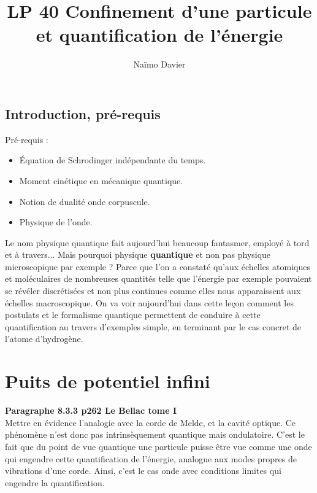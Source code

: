 \documentclass[12pt,prb,aps,epsf]{article}
\begin{document}
	
	\title{LP 40 Confinement d'une particule et quantification de l'énergie}
	\author{Naïmo Davier}
	
	\maketitle
	
	\tableofcontents
	
	\pagebreak
	
\subsection{Introduction, pré-requis}
Pré-requis : 
\begin{itemize}
	\item Équation de Schrodinger indépendante du temps.
	\item Moment cinétique en mécanique quantique.
	\item Notion de dualité onde corpuscule.
	\item Physique de l'onde.
\end{itemize}

Le nom physique quantique fait aujourd'hui beaucoup fantasmer, employé à tord et à travers... Mais pourquoi physique \textbf{quantique} et non pas physique microscopique par exemple ? Parce que l'on a constaté qu'aux échelles atomiques et moléculaires de nombreuses quantités telle que l'énergie par exemple pouvaient se révéler discrétisées et non plus continues comme elles nous apparaissent aux échelles macroscopique. On va voir aujourd'hui dans cette leçon comment les postulats et le formalisme quantique permettent de conduire à cette quantification au travers d'exemples simple, en terminant par le cas concret de l'atome d'hydrogène.

\section{Puits de potentiel infini}
\textbf{Paragraphe 8.3.3 p262 Le Bellac tome I}\\
Mettre en évidence l'analogie avec la corde de Melde, et la cavité optique. Ce phénomène n'est donc pas intrinsèquement quantique mais ondulatoire. C'est le fait que du point de vue quantique une particule puisse être vue comme une onde qui engendre cette quantification de l'énergie, analogue aux modes propres de vibrations d'une corde. Ainsi, c'est le cas onde avec conditions limites qui engendre la quantification.\\
\end{document}
